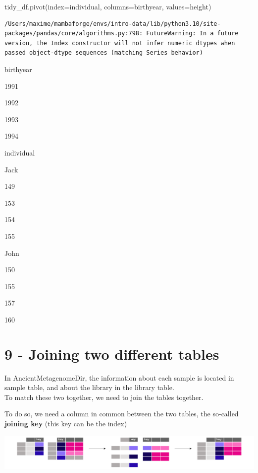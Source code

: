 \documentclass[
  letterpaper,
]{book}
\newenvironment{Shaded}{}{}
\newcommand{\NormalTok}[1]{\textcolor[rgb]{0.14,0.16,0.18}{#1}}
\newcommand{\OperatorTok}[1]{\textcolor[rgb]{0.14,0.16,0.18}{#1}}
\newcommand{\StringTok}[1]{\textcolor[rgb]{0.01,0.18,0.38}{#1}}
\begin{document}
\begin{Shaded}
\begin{Highlighting}[]
\NormalTok{tidy\_df.pivot(index}\OperatorTok{=}\StringTok{\textquotesingle{}individual\textquotesingle{}}\NormalTok{, columns}\OperatorTok{=}\StringTok{\textquotesingle{}birthyear\textquotesingle{}}\NormalTok{, values}\OperatorTok{=}\StringTok{\textquotesingle{}height\textquotesingle{}}\NormalTok{)}
\end{Highlighting}
\end{Shaded}

\begin{verbatim}
/Users/maxime/mambaforge/envs/intro-data/lib/python3.10/site-packages/pandas/core/algorithms.py:798: FutureWarning: In a future version, the Index constructor will not infer numeric dtypes when passed object-dtype sequences (matching Series behavior)
\end{verbatim}

birthyear

1991

1992

1993

1994

individual

Jack

149

153

154

155

John

150

155

157

160

\hypertarget{joining-two-different-tables}{%
\section{9 - Joining two different
tables}\label{joining-two-different-tables}}

In AncientMetagenomeDir, the information about each sample is located in
sample table, and about the library in the library table.\\
To match these two together, we need to join the tables together.

To do so, we need a column in common between the two tables, the
so-called \textbf{joining key} (this key can be the index)

\includegraphics{index_files/mediabag/assets/images/chapters/introduction-to-python/08_merge_left.pdf}
\end{document}
